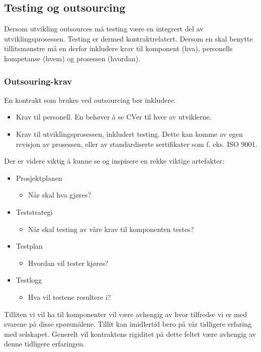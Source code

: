 \subsection{Testing og outsourcing}

Dersom utvikling outsources må testing være en integrert del av
utviklingsprosessen. Testing er dermed kontraktrelatert. Dersom en skal
benytte tillitsmønstre må en derfor inkludere krav til komponent (hva),
personells kompetanse (hvem) og prosessen (hvordan).

\subsubsection{Outsouring-krav}

En kontrakt som brukes ved outsourcing bør inkludere:

\begin{itemize}
\item
  Krav til personell. En behøver å se CVer til hver av utviklerne.
\item
  Krav til utviklingsprosessen, inkludert testing. Dette kan komme av
  egen revisjon av prosessen, eller av standardiserte sertifikater som
  f. eks. ISO 9001.
\end{itemize}
Der er videre viktig å kunne se og inspisere en rekke viktige
artefakter:

\begin{itemize}
\item
  Prosjektplanen
  \begin{itemize}
  \item
    Når skal hva gjøres?
  \end{itemize}
\item
  Teststrategi
  \begin{itemize}
  \item
    Når skal testing av våre krav til komponenten testes?
  \end{itemize}
\item
  Testplan
  \begin{itemize}
  \item
    Hvordan vil tester kjøres?
  \end{itemize}
\item
  Testlogg
  \begin{itemize}
  \item
    Hva vil testene resultere i?
  \end{itemize}
\end{itemize}
Tilliten vi vil ha til komponenter vil være avhengig av hvor tilfredse
vi er med svarene på disse spørsmålene. Tillit kan imidlertid bero på
vår tidligere erfaring med selskapet. Generelt vil kontraktens rigiditet
på dette feltet være avhengig av denne tidligere erfaringen.

